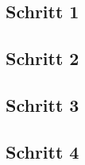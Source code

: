 


\clearpage
\subsection{Schritt 1}


\clearpage
\subsection{Schritt 2}


\clearpage
\subsection{Schritt 3}



\clearpage
\subsection{Schritt 4}
